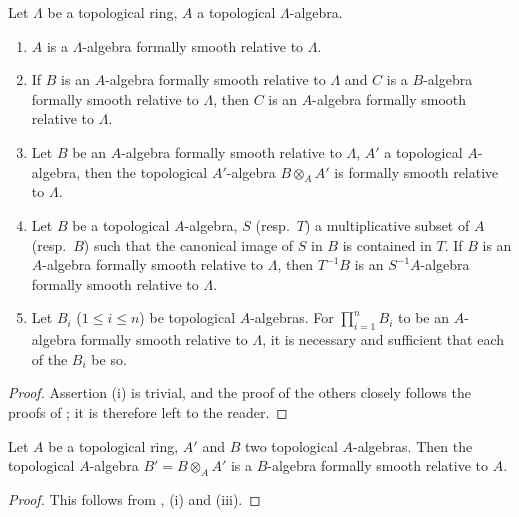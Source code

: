 \begin{proposition}[19.9.2]
\label{0.19.9.2}
Let $\Lambda$ be a topological ring, $A$ a topological $\Lambda$-algebra.
\begin{enumerate}
  \item[\rm(i)] $A$ is a $\Lambda$-algebra formally smooth relative to $\Lambda$.
  \item[\rm(ii)] If $B$ is an $A$-algebra formally smooth relative to $\Lambda$ and $C$ is a $B$-algebra formally smooth relative to $\Lambda$, then $C$ is an $A$-algebra formally smooth relative to $\Lambda$.
  \item[\rm(iii)] Let $B$ be an $A$-algebra formally smooth relative to $\Lambda$, $A'$ a topological $A$-algebra, then the topological $A'$-algebra $B\otimes_A A'$ is formally smooth relative to $\Lambda$.
  \item[\rm(iv)] Let $B$ be a topological $A$-algebra, $S$ (resp.\ $T$) a multiplicative subset of $A$ (resp.\ $B$) such that the canonical image of $S$ in $B$ is contained in $T$.
If $B$ is an $A$-algebra formally smooth relative to $\Lambda$, then $T^{-1}B$ is an $S^{-1}A$-algebra formally smooth relative to $\Lambda$.
  \item[\rm(v)] Let $B_i$ ($1\leq i\leq n$) be topological $A$-algebras.
For $\prod_{i=1}^n B_i$ to be an $A$-algebra formally smooth relative to $\Lambda$, it is necessary and sufficient that each of the $B_i$ be so.
\end{enumerate}
\end{proposition}

\begin{proof}
Assertion (i) is trivial, and the proof of the others closely follows the proofs of ; it is therefore left to the reader.
\end{proof}

\begin{corollary}[19.9.3]
\label{0.19.9.3}
Let $A$ be a topological ring, $A'$ and $B$ two topological $A$-algebras.
Then the topological $A$-algebra $B'=B\otimes_A A'$ is a $B$-algebra formally smooth relative to $A$.
\end{corollary}

\begin{proof}
This follows from , (i) and (iii).
\end{proof}

